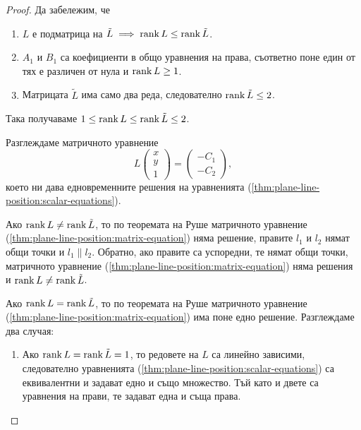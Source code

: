 \documentclass[numbers=endperiod, DIV=15]{scrartcl}
\begin{document}
\begin{proof}
  Да забележим, че
  \begin{enumerate}
    \item $L$ е подматрица на $\tilde L \implies \operatorname{rank} L \leq \operatorname{rank} \tilde L$.
    \item $A_1$ и $B_1$ са коефициенти в общо уравнения на права, съответно поне един от тях е различен от нула и $\operatorname{rank} L \geq 1$.
    \item Матрицата $\tilde L$ има само два реда, следователно $\operatorname{rank} \tilde L \leq 2$.
  \end{enumerate}

  Така получаваме $1 \leq \operatorname{rank} L \leq \operatorname{rank} \tilde L \leq 2$.

  Разглеждаме матричното уравнение
  \begin{equation}\label{thm:plane-line-position:matrix-equation}
    L
    \begin{pmatrix}
      x \\ y \\ 1
    \end{pmatrix}
    =
    \begin{pmatrix}
      -C_1 \\ -C_2
    \end{pmatrix},
  \end{equation}
  което ни дава едновременните решения на уравненията (\ref{thm:plane-line-position:scalar-equations}).

  Ако $\operatorname{rank} L \neq \operatorname{rank} \tilde L$, то по теоремата на Руше матричното уравнение (\ref{thm:plane-line-position:matrix-equation}) няма решение, правите $l_1$ и $l_2$ нямат общи точки и $l_1 \parallel l_2$. Обратно, ако правите са успоредни, те нямат общи точки, матричното уравнение (\ref{thm:plane-line-position:matrix-equation}) няма решения и $\operatorname{rank} L \neq \operatorname{rank} \tilde L$.

  Ако $\operatorname{rank} L = \operatorname{rank} \tilde L$, то по теоремата на Руше матричното уравнение (\ref{thm:plane-line-position:matrix-equation}) има поне едно решение. Разглеждаме два случая:
  \begin{enumerate}
    \item Ако $\operatorname{rank} L = \operatorname{rank} \tilde L = 1$, то редовете на $L$ са линейно зависими, следователно уравненията (\ref{thm:plane-line-position:scalar-equations}) са еквивалентни и задават едно и също множество. Тъй като и двете са уравнения на прави, те задават една и съща права.


\end{enumerate}
\end{proof}
\end{document}
